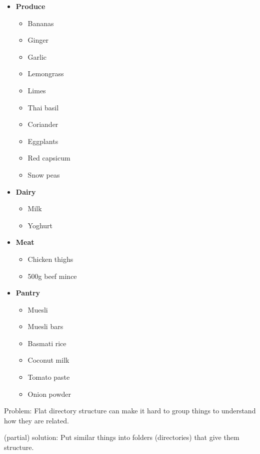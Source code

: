 \documentclass[
  letterpaper,
  justified,
  a4paper]{tufte-book}
\providecommand{\tightlist}{%
  \setlength{\itemsep}{0pt}\setlength{\parskip}{0pt}}
\providecommand{\tightlist}{%
  \setlength{\itemsep}{0pt}\setlength{\parskip}{0pt}}
\begin{document}
\begin{itemize}
\tightlist
\item
  \textbf{Produce}

  \begin{itemize}
  \tightlist
  \item
    Bananas
  \item
    Ginger
  \item
    Garlic
  \item
    Lemongrass
  \item
    Limes
  \item
    Thai basil
  \item
    Coriander
  \item
    Eggplants
  \item
    Red capsicum
  \item
    Snow peas
  \end{itemize}
\item
  \textbf{Dairy}

  \begin{itemize}
  \tightlist
  \item
    Milk
  \item
    Yoghurt
  \end{itemize}
\item
  \textbf{Meat}

  \begin{itemize}
  \tightlist
  \item
    Chicken thighs
  \item
    500g beef mince
  \end{itemize}
\item
  \textbf{Pantry}

  \begin{itemize}
  \tightlist
  \item
    Muesli
  \item
    Muesli bars
  \item
    Basmati rice
  \item
    Coconut milk
  \item
    Tomato paste
  \item
    Onion powder
  \end{itemize}
\end{itemize}

Problem: Flat directory structure can make it hard to group things to
understand how they are related.

(partial) solution: Put similar things into folders (directories) that
give them structure.
\end{document}
